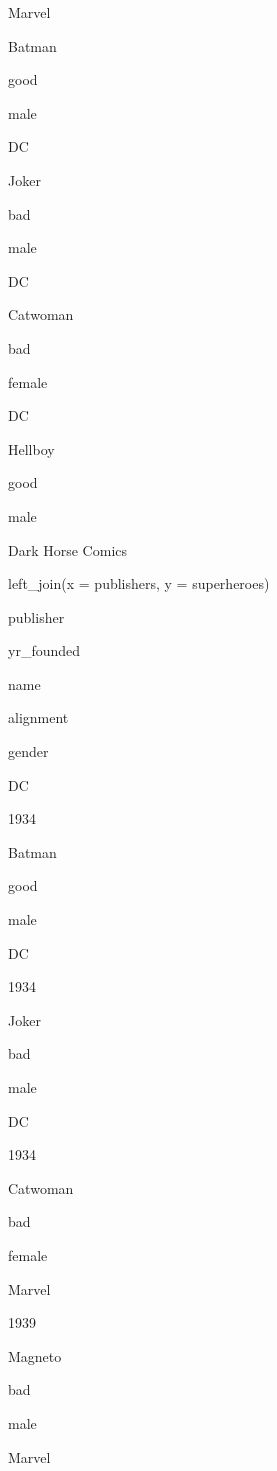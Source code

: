 Marvel
 


Batman
 
good
 
male
 
DC
 


Joker
 
bad
 
male
 
DC
 


Catwoman
 
bad
 
female
 
DC
 


Hellboy
 
good
 
male
 
Dark Horse Comics
 


left_join(x = publishers, y = superheroes)
 


publisher
 
yr_founded
 
name
 
alignment
 
gender
 



DC
 
1934
 
Batman
 
good
 
male
 


DC
 
1934
 
Joker
 
bad
 
male
 


DC
 
1934
 
Catwoman
 
bad
 
female
 


Marvel
 
1939
 
Magneto
 
bad
 
male
 


Marvel
 
